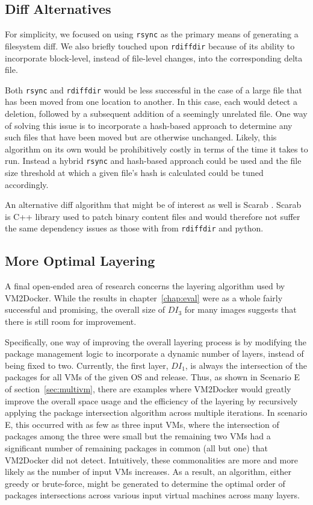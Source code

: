 \subsection{Diff Alternatives}
For simplicity, we focused on using \texttt{rsync} as the primary means of generating a filesystem diff. We also briefly touched upon \texttt{rdiffdir} because of its ability to incorporate block-level, instead of file-level changes, into the corresponding delta file.

Both \texttt{rsync} and \texttt{rdiffdir} would be less successful in the case of a large file that has been moved from one location to another. In this case, each would detect a deletion, followed by a subsequent addition of a seemingly unrelated file. One way of solving this issue is to incorporate a hash-based approach to determine any such files that have been moved but are otherwise unchanged. Likely, this algorithm on its own would be prohibitively costly in terms of the time it takes to run. Instead a hybrid \texttt{rsync} and hash-based approach could be used and the file size threshold at which a given file's hash is calculated could be tuned accordingly.

An alternative diff algorithm that might be of interest as well is Scarab \cite{scarab}. Scarab is C++ library used to patch binary content files and would therefore not suffer the same dependency issues as those with from \texttt{rdiffdir} and python.

\subsection{More Optimal Layering}
A final open-ended area of research concerns the layering algorithm used by VM2Docker. While the results in chapter~\ref{chap:eval} were as a whole fairly successful and promising, the overall size of $DI_3$ for many images suggests that there is still room for improvement.

Specifically, one way of improving the overall layering process is by modifying the package management logic to incorporate a dynamic number of layers, instead of being fixed to two. Currently, the first layer, $DI_1$, is always the intersection of the packages for all VMs of the given OS and release. Thus, as shown in Scenario E of section~\ref{sec:multivm}, there are examples where VM2Docker would greatly improve the overall space usage and the efficiency of the layering by recursively applying the package intersection algorithm across multiple iterations. In scenario E, this occurred with as few as three input VMs, where the intersection of packages among the three were small but the remaining two VMs had a significant number of remaining packages in common (all but one) that VM2Docker did not detect. Intuitively, these commonalities are more and more likely as the number of input VMs increases. As a result, an algorithm, either greedy or brute-force, might be generated to determine the optimal order of packages intersections across various input virtual machines across many layers.

